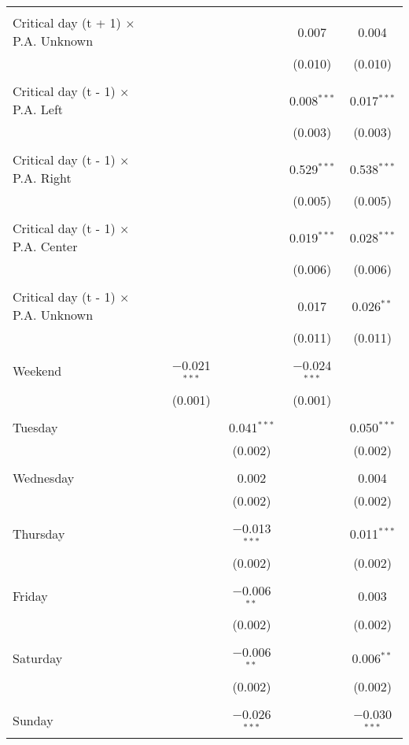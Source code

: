 \documentclass[
]{article}
\begin{document}
\begin{table}[!htbp]
{\begin{tabular}{@{\extracolsep{5pt}}lcccc}
  & & & & \\ 
 Critical day (t + 1) $\times$ P.A. Unknown &  &  & 0.007 & 0.004 \\ 
  &  &  & (0.010) & (0.010) \\ 
  & & & & \\ 
 Critical day (t - 1) $\times$ P.A. Left &  &  & 0.008$^{***}$ & 0.017$^{***}$ \\ 
  &  &  & (0.003) & (0.003) \\ 
  & & & & \\ 
 Critical day (t - 1) $\times$ P.A. Right &  &  & 0.529$^{***}$ & 0.538$^{***}$ \\ 
  &  &  & (0.005) & (0.005) \\ 
  & & & & \\ 
 Critical day (t - 1) $\times$ P.A. Center &  &  & 0.019$^{***}$ & 0.028$^{***}$ \\ 
  &  &  & (0.006) & (0.006) \\ 
  & & & & \\ 
 Critical day (t - 1) $\times$ P.A. Unknown &  &  & 0.017 & 0.026$^{**}$ \\ 
  &  &  & (0.011) & (0.011) \\ 
  & & & & \\ 
 Weekend & $-$0.021$^{***}$ &  & $-$0.024$^{***}$ &  \\ 
  & (0.001) &  & (0.001) &  \\ 
  & & & & \\ 
 Tuesday &  & 0.041$^{***}$ &  & 0.050$^{***}$ \\ 
  &  & (0.002) &  & (0.002) \\ 
  & & & & \\ 
 Wednesday &  & 0.002 &  & 0.004 \\ 
  &  & (0.002) &  & (0.002) \\ 
  & & & & \\ 
 Thursday &  & $-$0.013$^{***}$ &  & 0.011$^{***}$ \\ 
  &  & (0.002) &  & (0.002) \\ 
  & & & & \\ 
 Friday &  & $-$0.006$^{**}$ &  & 0.003 \\ 
  &  & (0.002) &  & (0.002) \\ 
  & & & & \\ 
 Saturday &  & $-$0.006$^{**}$ &  & 0.006$^{**}$ \\ 
  &  & (0.002) &  & (0.002) \\ 
  & & & & \\ 
 Sunday &  & $-$0.026$^{***}$ &  & $-$0.030$^{***}$ \\ 

\end{tabular}}
\end{table}
\end{document}
